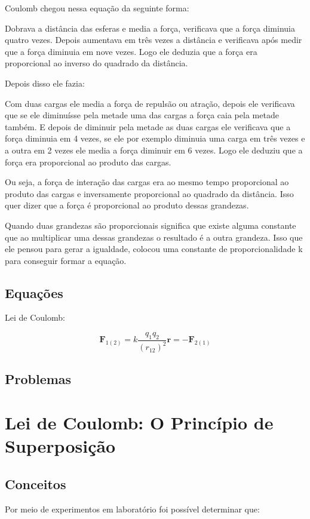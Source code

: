 \documentclass[a4paper, 12pt]{article}
\begin{document}
	Coulomb chegou nessa equação da seguinte forma:
	
	Dobrava a distância das esferas e media a força,  verificava que a força diminuia quatro vezes. Depois aumentava em três vezes  a distância e verificava após medir que a força diminuia em nove vezes. Logo ele deduzia que a força era proporcional ao inverso do quadrado da distância. 
	
	Depois disso ele fazia:
	
	Com duas cargas ele media a força de repulsão ou atração, depois ele verificava que se ele diminuísse pela metade uma das cargas a força caia pela metade também. E depois de diminuir pela metade as duas cargas ele verificava que a força diminuia em 4 vezes, se ele por exemplo diminuia uma carga em três vezes e a outra em 2 vezes ele media a força diminuir em 6 vezes. Logo ele deduziu que a força era proporcional ao produto das cargas.
	
	
	Ou seja, a força de interação das cargas era ao mesmo tempo proporcional ao produto das cargas e inversamente proporcional ao quadrado da distância. Isso quer dizer que a força é proporcional ao produto dessas grandezas. 
	
	Quando duas grandezas são proporcionais significa que existe alguma constante que ao multiplicar uma dessas grandezas o resultado é a outra grandeza. Isso que ele pensou para gerar a igualdade, colocou uma constante de proporcionalidade k para conseguir formar a equação.
	\subsection{Equações}
	
	Lei de Coulomb:
	
	$$\textbf{F}_{1(2)}=k\frac{q_1 q_2}{(r_{12})^2}\textbf{{r}}=-\textbf{F}_{2(1)}$$
	\subsection{Problemas}
	
	\section{Lei de Coulomb: O Princípio de Superposição}
	
	\subsection{Conceitos}
	
	Por meio de experimentos em laboratório foi possível determinar que:
	
\end{document}
